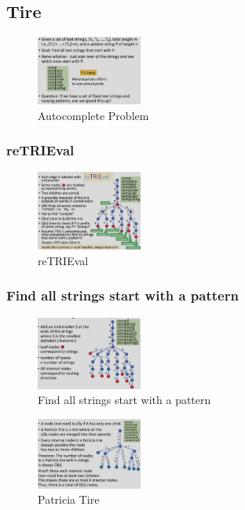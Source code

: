 \subsection{Tire}

\begin{figure}[H]
    \centering
    \includegraphics[width=0.309\textwidth]{pic/DAA7/Autocomplete Problem}
    \caption{Autocomplete Problem}
\end{figure}

\subsubsection{reTRIEval}
\begin{figure}[H]
    \centering
    \includegraphics[width=0.309\textwidth]{pic/DAA7/reTRIEval}
    \caption{reTRIEval}
\end{figure}

\subsubsection{Find all strings start with a pattern}

\begin{figure}[H]
    \centering
    \includegraphics[width=0.309\textwidth]{pic/DAA7/Find all strings start with a pattern}
    \caption{Find all strings start with a pattern}
\end{figure}

\begin{figure}[H]
    \centering
    \includegraphics[width=0.309\textwidth]{pic/DAA7/Patricia Tire}
    \caption{Patricia Tire}
\end{figure}

